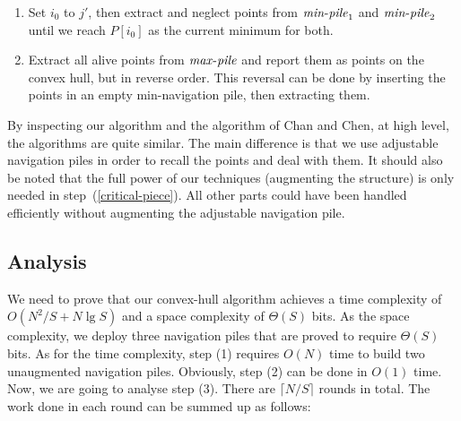 \documentclass[final,onetabnum,onefignum,onethmnum]{siamltex}
\newcommand{\MinOne}{\mbox{$\mathit{min}\mbox{\rm -}\mathit{pile}_1$}}
\newcommand{\MinTwo}{\mbox{$\mathit{min}\mbox{\rm -}\mathit{pile}_2$}}
\newcommand{\MaxPile}{\mbox{$\mathit{max}\mbox{\rm -}\mathit{pile}$}}
\begin{document}
\begin{enumerate}
\begin{enumerate}
\item \label{spec} Set $i_0$ to $j'$, then extract and
  neglect points from \MinOne{} and \MinTwo{} until we reach $P[i_0]$ as
  the current minimum for both.
\item  Extract all alive points from \MaxPile{} and report them as points on the convex hull, but in reverse order. This reversal can be done by inserting the points in an empty min-navigation pile, then extracting them.
\end{enumerate}
\end{enumerate}

By inspecting our algorithm and the algorithm of Chan and Chen, at
high level, the algorithms are quite similar. The main
difference is that we use adjustable navigation piles in order to
recall the points and deal with them. It should also be noted that
the full power of our techniques (augmenting the structure) is only needed 
in step~(\ref{critical-piece}). All other parts could have been handled efficiently without
augmenting the adjustable navigation pile.

\subsection{Analysis}

We need to prove that our convex-hull algorithm achieves a time
complexity of $O(N^2/S + N \lg S)$ and a space complexity of
$\Theta(S)$ bits. As the space complexity, we deploy three
navigation piles that are proved to require $\Theta(S)$ bits. As
for the time complexity, step (1) requires $O(N)$ time to build two
unaugmented navigation piles. Obviously, step (2) can
be done in $O(1)$ time. Now, we are going to analyse step (3). There
are $\lceil N/S \rceil$ rounds in total. The work done in each round
can be summed up as follows:
\end{document}
